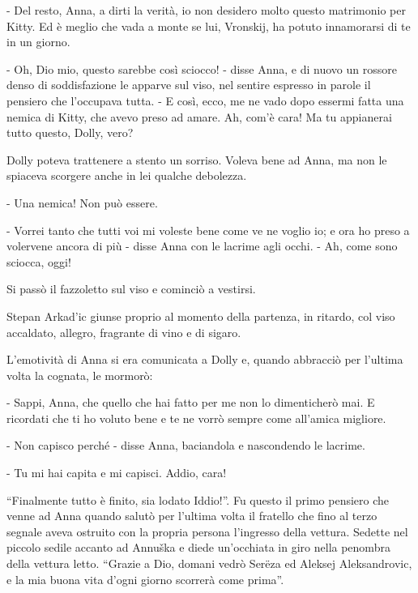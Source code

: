 - Del resto, Anna, a dirti la verità, io non desidero molto questo matrimonio per Kitty. Ed è meglio che vada a monte se lui, Vronskij, ha potuto innamorarsi di te in un giorno. 

- Oh, Dio mio, questo sarebbe così sciocco! - disse Anna, e di nuovo un rossore denso di soddisfazione le apparve sul viso, nel sentire espresso in parole il pensiero che l'occupava tutta. - E così, ecco, me ne vado dopo essermi fatta una nemica di Kitty, che avevo preso ad amare. Ah, com'è cara! Ma tu appianerai tutto questo, Dolly, vero? 

Dolly poteva trattenere a stento un sorriso. Voleva bene ad Anna, ma non le spiaceva scorgere anche in lei qualche debolezza. 

- Una nemica! Non può essere. 

- Vorrei tanto che tutti voi mi voleste bene come ve ne voglio io; e ora ho preso a volervene ancora di più - disse Anna con le lacrime agli occhi. - Ah, come sono sciocca, oggi! 

Si passò il fazzoletto sul viso e cominciò a vestirsi. 

Stepan Arkad'ic giunse proprio al momento della partenza, in ritardo, col viso accaldato, allegro, fragrante di vino e di sigaro. 

L'emotività di Anna si era comunicata a Dolly e, quando abbracciò per l'ultima volta la cognata, le mormorò: 

- Sappi, Anna, che quello che hai fatto per me non lo dimenticherò mai. E ricordati che ti ho voluto bene e te ne vorrò sempre come all'amica migliore. 

- Non capisco perché - disse Anna, baciandola e nascondendo le lacrime. 

- Tu mi hai capita e mi capisci. Addio, cara! 

\label{xxix} 

``Finalmente tutto è finito, sia lodato Iddio!''. Fu questo il primo pensiero che venne ad Anna quando salutò per l'ultima volta il fratello che fino al terzo segnale aveva ostruito con la propria persona l'ingresso della vettura. Sedette nel piccolo sedile accanto ad Annuška e diede un'occhiata in giro nella penombra della vettura letto. ``Grazie a Dio, domani vedrò Serëza ed Aleksej Aleksandrovic, e la mia buona vita d'ogni giorno scorrerà come prima''. 

